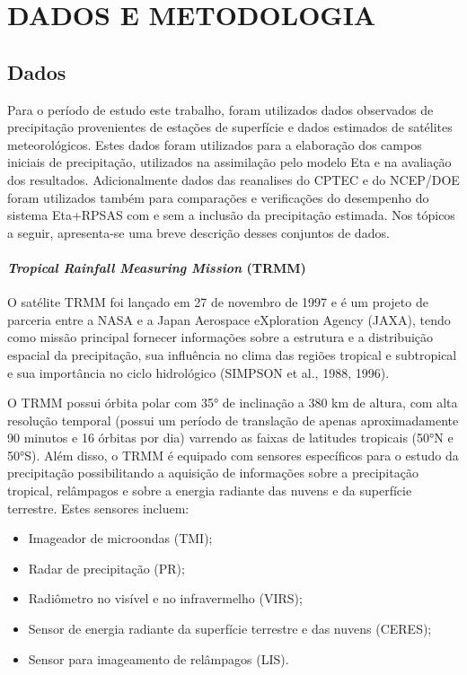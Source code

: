 \hypertarget{estilo:capitulo}{}
\chapter{DADOS E METODOLOGIA}

\section{Dados}
\label{ss:dados}

Para o período de estudo este trabalho, foram utilizados dados observados de precipitação provenientes de estações de superfície e dados estimados de satélites meteorológicos. Estes dados foram utilizados para a elaboração dos campos iniciais de precipitação, utilizados na assimilação pelo modelo Eta e na avaliação dos resultados. Adicionalmente dados das reanalises do CPTEC e do NCEP/DOE foram utilizados também para comparações e verificações do desempenho do sistema Eta+RPSAS com e sem a inclusão da precipitação estimada. Nos tópicos a seguir, apresenta-se uma breve descrição desses conjuntos de dados.

\subsubsection{\textit{Tropical Rainfall Measuring Mission} (TRMM)}

O satélite TRMM foi lançado em 27 de novembro de 1997 e é um projeto de parceria entre a NASA e a Japan Aerospace eXploration Agency (JAXA), tendo como missão principal  fornecer informações sobre a estrutura e a distribuição espacial da precipitação, sua influência no clima das regiões tropical e subtropical e sua importância no ciclo hidrológico (SIMPSON et al., 1988, 1996).

O TRMM possui órbita polar com 35° de inclinação a 380 km de altura, com alta resolução temporal (possui um período de translação de apenas aproximadamente 90 minutos e 16 órbitas por dia) varrendo as faixas de latitudes tropicais (50°N e 50°S). Além disso, o TRMM é equipado com sensores específicos para o estudo da precipitação possibilitando a aquisição de informações sobre a precipitação tropical, relâmpagos e sobre a energia radiante das nuvens e da superfície terrestre. Estes sensores incluem:

\begin{itemize}
\item Imageador de microondas (TMI);
\item Radar de precipitação (PR);
\item Radiômetro no visível e no infravermelho (VIRS);
\item Sensor de energia radiante da superfície terrestre e das nuvens (CERES);
\item Sensor para imageamento de relâmpagos (LIS).
\end{itemize}
    
